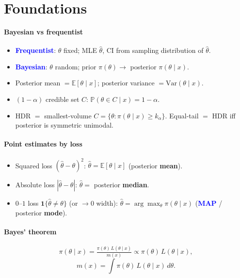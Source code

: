 
\section{Foundations}

\paragraph{Bayesian vs frequentist}
\begin{itemize}
  \item \textcolor{Blue}{\textbf{Frequentist}}: $\theta$ fixed; MLE $\hat\theta$, CI from sampling distribution of $\hat\theta$.
  \item \textcolor{Blue}{\textbf{Bayesian}}: $\theta$ random; prior $\pi(\theta)\to$ posterior $\pi(\theta\mid x)$.
  \item \textcolor{Bittersweet}{Posterior mean} $=\mathbb{E}[\theta\mid x]$; \textcolor{Bittersweet}{posterior variance} $=\mathrm{Var}(\theta\mid x)$.
  \item \textcolor{Bittersweet}{$(1-\alpha)$ credible set} $C$: $\mathbb{P}(\theta\in C\mid x)=1-\alpha$.
  \item \textcolor{Bittersweet}{HDR} $=$ smallest-volume $C=\{\theta:\pi(\theta\mid x)\ge k_\alpha\}$. Equal-tail $=$ HDR iff posterior is symmetric unimodal.
\end{itemize}

\paragraph{Point estimates by loss}
\begin{itemize}
  \item \textcolor{Bittersweet}{Squared loss} $(\hat\theta-\theta)^2$: $\hat\theta=\mathbb{E}[\theta\mid x]$ (posterior \textbf{mean}).
  \item \textcolor{Bittersweet}{Absolute loss} $|\hat\theta-\theta|$: $\hat\theta=$ posterior \textbf{median}.
  \item \textcolor{Bittersweet}{$0$--$1$ loss} $\mathbf{1}\{\hat\theta\ne\theta\}$ (or $\to 0$ width): $\hat\theta=\arg\max_\theta \pi(\theta\mid x)$ (\textcolor{Blue}{\textbf{MAP}} / posterior \textbf{mode}).
\end{itemize}

\paragraph{Bayes' theorem}
\[\pi(\theta\mid x)=\tfrac{\pi(\theta)\,L(\theta\mid x)}{m(x)}\propto \pi(\theta)\,L(\theta\mid x),\]
\[m(x)=\int \pi(\theta)\,L(\theta\mid x)\,d\theta.\]


